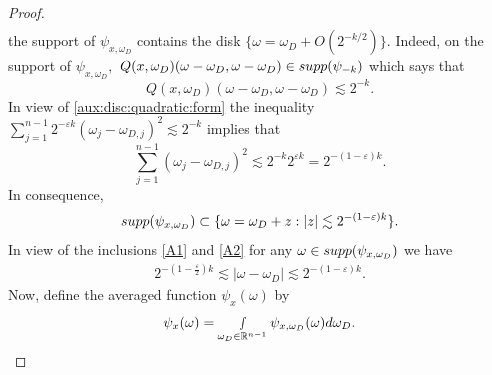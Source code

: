 \documentclass[12pt, reqno]{amsart}
\theoremstyle{definition}
\theoremstyle{remark}
\numberwithin{equation}{section}
\begin{document}
\begin{proof}
\begin{align}
\end{align} the support of $\psi_{x,\omega_D}$ contains the disk $\{\omega=\omega_D+O(2^{- k/2})\}.$ Indeed, on the support of $\psi_{x,\omega_D},$  
 $Q(x,\omega_D)(\omega-\omega_D,\omega-\omega_D)\in \textnormal{supp}(\psi_{-k})$ which says that
$$ Q(x,\omega_D)(\omega-\omega_D,\omega-\omega_D)\lesssim 2^{-k}.$$ In view of \eqref{aux:disc:quadratic:form} the inequality
$\sum_{j=1}^{n-1}2^{-\varepsilon k}(\omega_j-\omega_{D,j})^{2}\lesssim  2^{-k} $
implies that 
$$\sum_{j=1}^{n-1}(\omega_j-\omega_{D,j})^{2}\lesssim  2^{-k} 2^{\varepsilon k}= 2^{-(1-\varepsilon)k}. $$ 
In consequence, 
\begin{align}\label{A2}
\textnormal{supp}(\psi_{x,\omega_D})\subset \{\omega=\omega_D+z:|z|\lesssim2^{-(1-\varepsilon)k}\}.
\end{align} In view of the inclusions \eqref{A1}   and \eqref{A2} for any $\omega\in \textnormal{supp}(\psi_{x,\omega_D})$ we have
\begin{align}
  2^{-(1-\frac{\varepsilon}{2})k }\lesssim  |\omega-\omega_D|\lesssim 2^{-(1-\varepsilon)k } .
\end{align} Now, define the averaged  function $\psi_{x}(\omega)$ by
\begin{equation}
    \psi_{x}(\omega)=\smallint_{\omega_D\in \mathbb{R}^{n-1}}\psi_{x,\omega_D}(\omega)d\omega_{D}.
\end{equation}



\end{proof}
\end{document}
